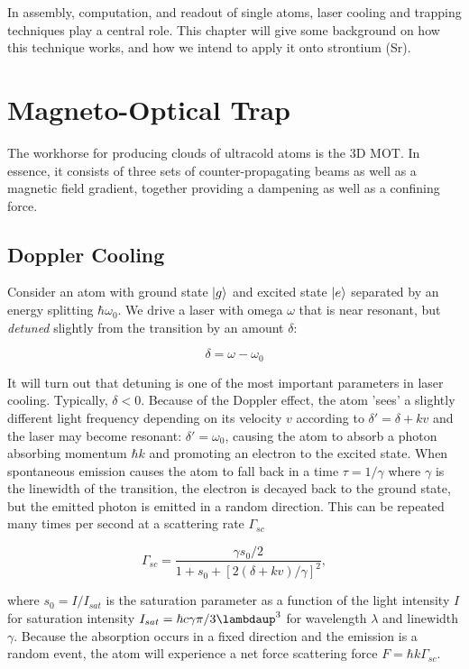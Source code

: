 In assembly, computation, and readout of single atoms, laser cooling and trapping techniques play a central role. This chapter will give some background on how this technique works, and how we intend to apply it onto strontium (Sr).

\section{Magneto-Optical Trap}

The workhorse for producing clouds of ultracold atoms is the 3D \ac{MOT}. In essence, it consists of three sets of counter-propagating beams as well as a magnetic field gradient, together providing a dampening as well as a confining force. 

\subsection{Doppler Cooling}

Consider an atom with ground state $\lvert g\rangle$ and excited state $\lvert e\rangle$ separated by an energy splitting $\hbar \omega_0$. We drive a laser with omega $\omega$ that is near resonant, but \emph{detuned} slightly from the transition by an amount $\delta$:

\begin{equation}\label{detuning}
	\delta = \omega - \omega_0
\end{equation}

It will turn out that detuning is one of the most important parameters in laser cooling. Typically, $\delta <0$. Because of the Doppler effect, the atom 'sees' a slightly different light frequency depending on its velocity $v$ according to $\delta'=\delta+kv$ and the laser may become resonant: $\delta' = \omega_0$, causing the atom to absorb a photon absorbing momentum $\hbar k$ and promoting an electron to the excited state. When spontaneous emission causes the atom to fall back in a time $\tau = 1/\gamma$ where $\gamma$ is the linewidth of the transition, the electron is decayed back to the ground state, but the emitted photon is emitted in a random direction. This can be repeated many times per second at a scattering rate $\Gamma_{sc}$ \cite{Metcalf1999}

\begin{equation}\label{eq:ScatteringFrequency}
	\Gamma_{sc} = \frac{ \gamma s_0 /2}{1+s_0+\left[2(\delta+ k v)/\gamma\right]^2},
\end{equation}

where $s_0 = I/I_{sat}$ is the saturation parameter as a function of the light intensity $I$ for saturation intensity $I_{sat} = \hbar c \gamma \pi/3\lambdaup^3$ for wavelength $\lambda$ and linewidth $\gamma$. Because the absorption occurs in a fixed direction and the emission is a random event, the atom will experience a net force scattering force $F = \hbar k \Gamma_{sc}$.

